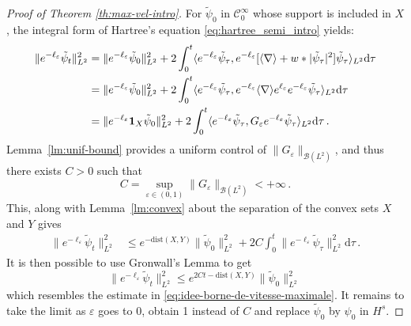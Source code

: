 \documentclass[12pt]{article}
\newcommand{\jnabla}{{\langle\nabla\rangle}}
\newcommand{\dXY}{{\mathrm{dist}(X,Y)}}
\theoremstyle{plain}
\newcommand{\diff}{\mathrm{d}}
\newcommand{\Tepsilon}{{G_\varepsilon}}
\let\Im\relax
\DeclareMathOperator{\Im}{Im}
\begin{document}
\begin{proof}[Proof of Theorem \ref{th:max-vel-intro}]
For $\tilde{\psi}_{0}$ in $\mathcal{C}_{0}^{\infty}$ whose support is included in $X$,
the integral form of Hartree's equation \eqref{eq:hartree_semi_intro} yields:
\begin{align}
\|e^{-\ell_{\varepsilon}}\tilde{\psi}_{t}\|_{L^{2}}^{2} & =\|e^{-\ell_{\varepsilon}}\tilde{\psi}_{0}\|_{L^{2}}^{2}+2\Im\int_{0}^{t}\langle e^{-\ell_{\varepsilon}}\tilde{\psi}_{\tau},e^{-\ell_{\varepsilon}}[\jnabla+w*|\tilde{\psi}_{\tau}|^{2}]\tilde{\psi}_{\tau}\rangle_{L^{2}}\diff\tau\nonumber \\
 & =\|e^{-\ell_{\varepsilon}}\tilde{\psi}_{0}\|_{L^{2}}^{2}+2\Im\int_{0}^{t}\langle e^{-\ell_{\varepsilon}}\tilde{\psi}_{\tau},e^{-\ell_{\varepsilon}}\jnabla e^{\ell_{\varepsilon}}e^{-\ell_{\varepsilon}}\tilde{\psi}_{\tau}\rangle_{L^{2}}\diff\tau\nonumber \\
 & =\|e^{-\ell_{\varepsilon}}\mathbf{1}_{X}\tilde{\psi}_{0}\|_{L^{2}}^{2}+2\int_{0}^{t}\langle e^{-\ell_{\varepsilon}}\tilde{\psi}_{\tau},\Tepsilon e^{-\ell_{\varepsilon}}\tilde{\psi}_{\tau}\rangle_{L^{2}}\diff\tau\,.\label{eq:borne-integrale-exp-ell-eps-psi}
\end{align}
Lemma~\ref{lm:unif-bound} provides a uniform control of $\|\Tepsilon \|_{\mathcal{B}(L^{2})}$, and thus there exists $C>0$ such that
\[
C=\sup_{\varepsilon\in(0,1)}\|\Tepsilon \|_{\mathcal{B}(L^{2})}<+\infty\,.
\]
This, along with Lemma~\ref{lm:convex} about the separation of the convex sets $X$ and $Y$ gives
\begin{align*}
\|e^{-\ell_{\varepsilon}}\tilde{\psi}_{t}\|_{L^2}^{2} & \leq e^{-\dXY}\|\tilde{\psi}_{0}\|_{L^2}^{2}+2C\int_{0}^{t}\|e^{-\ell_{\varepsilon}}\tilde{\psi}_{\tau}\|_{L^2}^{2}\diff\tau\,.
\end{align*}
It is then possible to use Gronwall's Lemma to get
\begin{equation}
\|e^{-\ell_{\varepsilon}}\tilde{\psi}_{t}\|_{L^2}^{2}\leq e^{2Ct-\dXY}\|\tilde{\psi}_{0}\|_{L^2}^{2}\, \label{eq:borne-unif-exp(-leps)-psi}
\end{equation}
which resembles the estimate in \eqref{eq:idee-borne-de-vitesse-maximale}. It remains to take the limit as $\varepsilon$ goes to $0$, obtain 1 instead of $C$ and replace $\tilde{\psi}_{0}$ by $\psi_{0}$ in $H^{s}$.


\end{proof}
\end{document}
